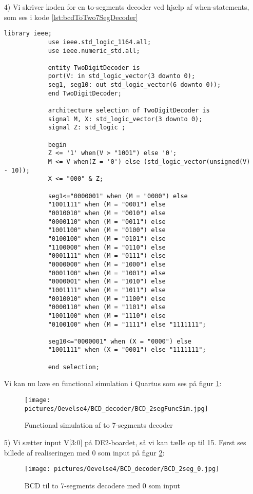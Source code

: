 \begin{enumerate}
\item[4)]
	Vi skriver koden for en to-segments decoder ved hjælp af when-statements, som ses i kode  \ref{lst:bcdToTwo7SegDecoder}
			\begin{lstlisting}[caption={BCD til to 7 segment decoder},label={lst:bcdToTwo7SegDecoder}]
			library ieee;
			use ieee.std_logic_1164.all;
			use ieee.numeric_std.all;
			
			entity TwoDigitDecoder is
			port(V: in std_logic_vector(3 downto 0);
			seg1, seg10: out std_logic_vector(6 downto 0));
			end TwoDigitDecoder;
			
			architecture selection of TwoDigitDecoder is
			signal M, X: std_logic_vector(3 downto 0);
			signal Z: std_logic ;
			
			begin
			Z <= '1' when(V > "1001") else '0';
			M <= V when(Z = '0') else (std_logic_vector(unsigned(V) - 10));  
			X <= "000" & Z;
			
			seg1<="0000001" when (M = "0000") else
			"1001111" when (M = "0001") else
			"0010010" when (M = "0010") else
			"0000110" when (M = "0011") else
			"1001100" when (M = "0100") else
			"0100100" when (M = "0101") else
			"1100000" when (M = "0110") else
			"0001111" when (M = "0111") else
			"0000000" when (M = "1000") else
			"0001100" when (M = "1001") else
			"0000001" when (M = "1010") else
			"1001111" when (M = "1011") else
			"0010010" when (M = "1100") else
			"0000110" when (M = "1101") else
			"1001100" when (M = "1110") else
			"0100100" when (M = "1111") else "1111111";
			
			seg10<="0000001" when (X = "0000") else
			"1001111" when (X = "0001") else "1111111";
			
			end selection;
			\end{lstlisting}
	Vi kan nu lave en functional simulation i Quartus som ses på figur \ref{fig:2SegFuncSim}:
	\begin{figure}[h]
		\centering
		\texttt{[image: pictures/Oevelse4/BCD\_decoder/BCD\_2segFuncSim.jpg]}
		\caption{Functional simulation af to 7-segments decoder}
		\label{fig:2SegFuncSim}
	\end{figure}
	
	\item[5)]
	Vi sætter input V[3:0] på DE2-boardet, så vi kan tælle op til 15. Først ses billede af realiseringen med 0 som input på figur \ref{fig:2Seg0}:
	\begin{figure}[h]
		\centering
		\texttt{[image: pictures/Oevelse4/BCD\_decoder/BCD\_2seg\_0.jpg]}
		\caption{BCD til to 7-segments decodere med 0 som input}
		\label{fig:2Seg0}
	\end{figure}


\end{enumerate}
